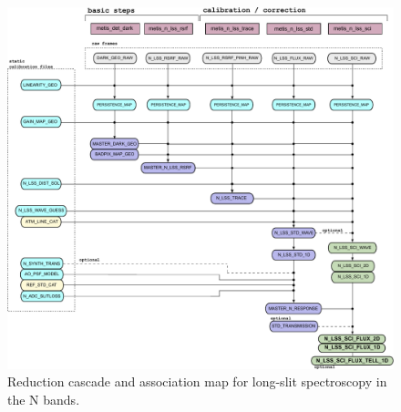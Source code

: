 
\begin{landscape}
\begin{figure}[ht]
  \centering
  \includegraphics{figures/N_LSS_pipeline_wf_draft_latest_part_1_v0.84.pdf}
  \caption[Reduction cascade and association map for N long-slit
  spectroscopy]{Reduction cascade and association map for long-slit
    spectroscopy in the N bands. }
  \label{Fig:NLssAssomap1}
    \end{figure}
\end{landscape}

